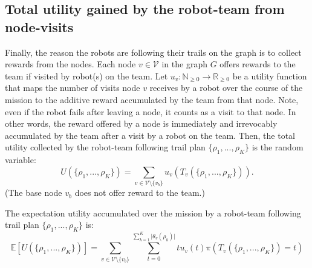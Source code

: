 \documentclass[11pt, oneside]{article}
\begin{document}


\subsection{Total utility gained by the robot-team from node-visits}
Finally, the reason the robots are following their trails on the graph is to collect rewards from the nodes.
Each node $v\in \mathcal{V}$ in the graph $G$ offers rewards to the team if visited by robot(s) on the team. 
Let $u_v: \mathbb{N}_{\geq 0} \rightarrow \mathbb{R}_{\geq 0}$ be a utility function that maps 
the number of visits node $v$ receives by a robot over the course of the mission
 to 
 the additive reward accumulated by the team from that node.
Note, even if the robot fails after leaving a node, it counts as a visit to that node.
In other words, the reward offered by a node is immediately and irrevocably accumulated by the team after a visit by a robot on the team.
Then, the total utility collected by the robot-team following trail plan $\{\rho_1, ..., \rho_K\}$ is the random variable:
\begin{equation}
U(\{\rho_1,...,\rho_K\}) = \sum_{v\in\mathcal{V}\setminus \{v_b\}} u_v\left ( T_v(\{\rho_1, ..., \rho_K\}) \right).
\end{equation}
(The base node $v_b$ does not offer reward to the team.)

The expectation utility accumulated over the mission by a robot-team following trail plan $\{\rho_1, ..., \rho_K\}$ is:
\begin{equation}
	\mathbb{E}[U(\{\rho_1,...,\rho_K\})]= \sum_{v\in\mathcal{V}\setminus \{v_b\}} \sum_{t= 0}^{\sum_{k=1}^K \lvert \theta_v(\rho_k) \rvert } t u_v(t) \pi(T_v(\{\rho_1, ..., \rho_K\}) = t)
\end{equation}
\end{document}
